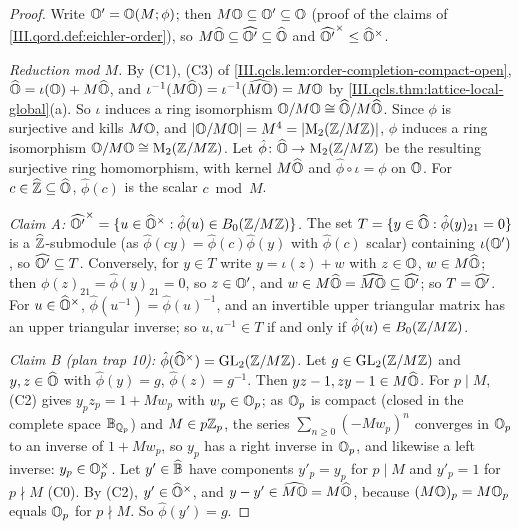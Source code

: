 \begin{theorem}
\end{theorem}
\begin{proof}
Write $\mathbb{O}'=\mathbb{O}(M;\phi)$; then $M\mathbb{O}\subseteq\mathbb{O}'\subseteq\mathbb{O}$ (proof of the claims of \cref{III.qord.def:eichler-order}), so
$M\widehat{\mathbb{O}}\subseteq\widehat{\mathbb{O}'}\subseteq\widehat{\mathbb{O}}$ and $\widehat{\mathbb{O}'}^\times\le\widehat{\mathbb{O}}^\times$.

\emph{Reduction mod $M$.} By (C1), (C3) of \cref{III.qcls.lem:order-completion-compact-open}, $\widehat{\mathbb{O}}=\iota(\mathbb{O})+M\widehat{\mathbb{O}}$, and $\iota^{-1}(M\widehat{\mathbb{O}})=
\iota^{-1}(\widehat{M\mathbb{O}})=M\mathbb{O}$ by \cref{III.qcls.thm:lattice-local-global}(a). So $\iota$ induces a ring isomorphism $\mathbb{O}/M\mathbb{O}\cong\widehat{\mathbb{O}}/M\widehat{\mathbb{O}}$.
Since $\phi$ is surjective and kills $M\mathbb{O}$, and $\lvert\mathbb{O}/M\mathbb{O}\rvert=M^4=\lvert\mathrm{M}_2(\mathbb{Z}/M\mathbb{Z})\rvert$, $\phi$ induces a ring isomorphism
$\mathbb{O}/M\mathbb{O}\cong\mathrm{M}_2(\mathbb{Z}/M\mathbb{Z})$. Let $\hat\phi\colon\widehat{\mathbb{O}}\to\mathrm{M}_2(\mathbb{Z}/M\mathbb{Z})$ be the resulting surjective ring homomorphism, with kernel $M\widehat{\mathbb{O}}$ and
$\hat\phi\circ\iota=\phi$ on $\mathbb{O}$. For $c\in\widehat{\mathbb{Z}}\subseteq\widehat{\mathbb{O}}$, $\hat\phi(c)$ is the scalar $c\bmod M$.

\emph{Claim A: $\widehat{\mathbb{O}'}^\times=\{u\in\widehat{\mathbb{O}}^\times:\hat\phi(u)\in B_0(\mathbb{Z}/M\mathbb{Z})\}$.} The set $T=\{y\in\widehat{\mathbb{O}}:\hat\phi(y)_{21}=0\}$ is a
$\widehat{\mathbb{Z}}$-submodule (as $\hat\phi(cy)=\hat\phi(c)\hat\phi(y)$ with $\hat\phi(c)$ scalar) containing $\iota(\mathbb{O}')$, so $\widehat{\mathbb{O}'}\subseteq T$. Conversely, for
$y\in T$ write $y=\iota(z)+w$ with $z\in\mathbb{O}$, $w\in M\widehat{\mathbb{O}}$; then $\phi(z)_{21}=\hat\phi(y)_{21}=0$, so $z\in\mathbb{O}'$, and $w\in M\widehat{\mathbb{O}}=\widehat{M\mathbb{O}}\subseteq
\widehat{\mathbb{O}'}$; so $T=\widehat{\mathbb{O}'}$. For $u\in\widehat{\mathbb{O}}^\times$, $\hat\phi(u^{-1})=\hat\phi(u)^{-1}$, and an invertible upper triangular matrix has an upper
triangular inverse; so $u,u^{-1}\in T$ if and only if $\hat\phi(u)\in B_0(\mathbb{Z}/M\mathbb{Z})$.

\emph{Claim B (plan trap 10): $\hat\phi(\widehat{\mathbb{O}}^\times)=\mathrm{GL}_2(\mathbb{Z}/M\mathbb{Z})$.} Let $g\in\mathrm{GL}_2(\mathbb{Z}/M\mathbb{Z})$ and $y,z\in\widehat{\mathbb{O}}$ with $\hat\phi(y)=g$, $\hat\phi(z)=g^{-1}$. Then
$yz-1,zy-1\in M\widehat{\mathbb{O}}$. For $p\mid M$, (C2) gives $y_pz_p=1+Mw_p$ with $w_p\in\mathbb{O}_p$; as $\mathbb{O}_p$ is compact (closed in the complete space $\mathbb{B}_{\mathbb{Q}_p}$) and
$M\in p\mathbb{Z}_p$, the series $\sum_{n\ge0}(-Mw_p)^n$ converges in $\mathbb{O}_p$ to an inverse of $1+Mw_p$, so $y_p$ has a right inverse in $\mathbb{O}_p$, and likewise a
left inverse: $y_p\in\mathbb{O}_p^\times$. Let $y'\in\widehat{\mathbb{B}}$ have components $y'_p=y_p$ for $p\mid M$ and $y'_p=1$ for $p\nmid M$ (C0). By (C2), $y'\in\widehat{\mathbb{O}}^\times$, and
$y-y'\in\widehat{M\mathbb{O}}=M\widehat{\mathbb{O}}$, because $(M\mathbb{O})_p=M\mathbb{O}_p$ equals $\mathbb{O}_p$ for $p\nmid M$. So $\hat\phi(y')=g$.


\end{proof}
